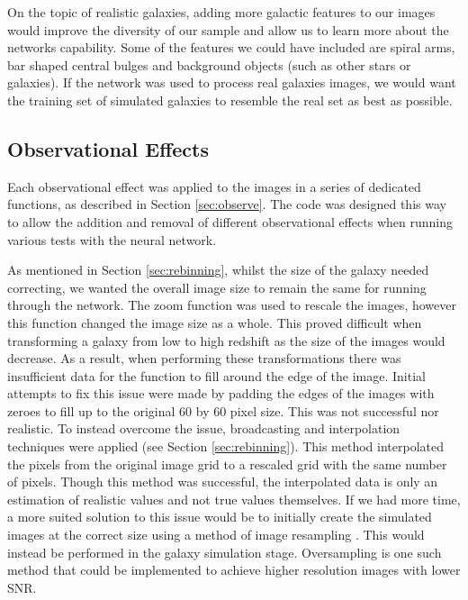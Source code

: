 \documentclass[fleqn,usenatbib]{mnras}
\begin{document}
On the topic of realistic galaxies, adding more galactic features to our images would improve the diversity of our sample and allow us to learn more about the networks capability. Some of the features we could have included are spiral arms, bar shaped central bulges and background objects (such as other stars or galaxies). If the network was used to process real galaxies images, we would want the training set of simulated galaxies to resemble the real set as best as possible. 

\subsection{Observational Effects} \label{sec:observational-discussion}
Each observational effect was applied to the images in a series of dedicated functions, as described in Section \ref{sec:observe}. The code was designed this way to allow the addition and removal of different observational effects when running various tests with the neural network.

As mentioned in Section \ref{sec:rebinning}, whilst the size of the galaxy needed correcting, we wanted the overall image size to remain the same for running through the network. The zoom function was used to rescale the images, however this function changed the image size as a whole. This proved difficult when transforming a galaxy from low to high redshift as the size of the images would decrease. As a result, when performing these transformations there was insufficient data for the function to fill around the edge of the image. Initial attempts to fix this issue were made by padding the edges of the images with zeroes to fill up to the original 60 by 60 pixel size. This was not successful nor realistic. To instead overcome the issue, broadcasting and interpolation techniques were applied (see Section \ref{sec:rebinning}). This method interpolated the pixels from the original image grid to a rescaled grid with the same number of pixels. Though this method was successful, the interpolated data is only an estimation of realistic values and not true values themselves. If we had more time, a more suited solution to this issue would be to initially create the simulated images at the correct size using a method of image resampling \citep{Devillard2000}. This would instead be performed in the galaxy simulation stage. Oversampling is one such method that could be implemented to achieve higher resolution images with lower SNR. 
\end{document}

